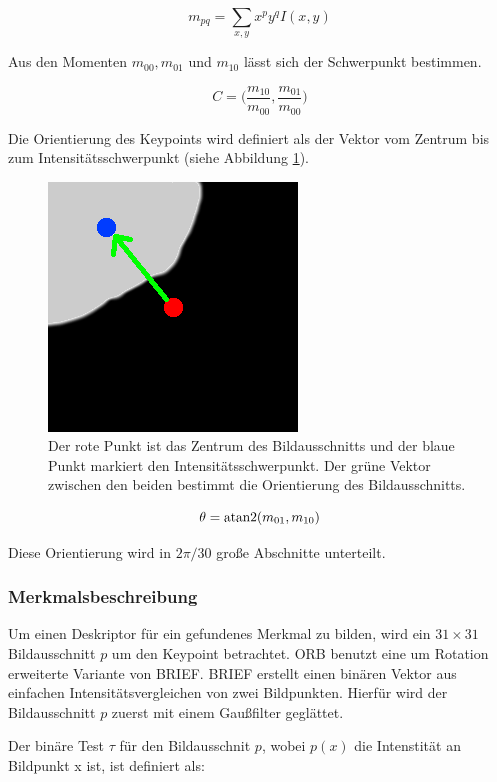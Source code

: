 \[
m_{pq} = \sum_{x, y} x^p y^q I(x, y)
\]

Aus den Momenten $m_{00}, m_{01}$ und $m_{10}$ lässt sich der Schwerpunkt bestimmen.

\[
C =  \bigg(\frac{m_{10}}{m_{00}} , \frac{m_{01}}{m_{00}}\bigg)
\]

Die Orientierung des Keypoints wird definiert als der Vektor vom Zentrum bis zum Intensitätsschwerpunkt (siehe Abbildung \ref{fig:centroid}).

\begin{figure}[h]

    \centering
		\includegraphics[scale=0.65]{bilder/centroid.png}
    	\caption{Der rote Punkt ist das Zentrum des Bildausschnitts und der blaue Punkt markiert den Intensitätsschwerpunkt. Der grüne Vektor zwischen den beiden bestimmt die Orientierung des Bildausschnitts.}
\label{fig:centroid}
\end{figure}


\[
\theta = \operatorname{atan2} (m_{01}, m_{10})
\]

Diese Orientierung wird in $2\pi / 30$ große Abschnitte unterteilt.

\subsubsection{Merkmalsbeschreibung}

Um einen Deskriptor für ein gefundenes Merkmal zu bilden, wird ein $31 \times 31$ Bildausschnitt $p$ um den Keypoint betrachtet.
ORB benutzt eine um Rotation erweiterte Variante von BRIEF.
BRIEF erstellt einen binären Vektor aus einfachen Intensitätsvergleichen von zwei Bildpunkten. Hierfür wird der Bildausschnitt $p$ zuerst mit einem Gaußfilter geglättet.

Der binäre Test $\tau$ für den Bildausschnit $p$, wobei $p(x)$ die Intenstität an Bildpunkt x ist, ist definiert als:

